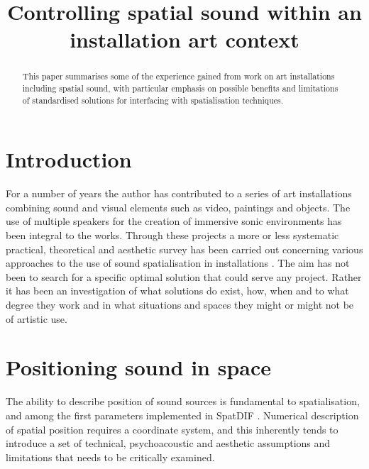 \documentclass{article}
\title{Controlling spatial sound within an installation art context}
\begin{document}
%
\maketitle
%
\begin{abstract}

This paper summarises some of the experience gained from work on art installations including spatial sound, with particular emphasis on possible benefits and limitations of standardised solutions for interfacing with spatialisation techniques.

\end{abstract}
%

\section{Introduction}\label{sec:introduction} %

For a number of years the author has contributed to a series of art installations combining sound and visual elements such as video, paintings and objects. The use of multiple speakers for the creation of immersive sonic environments has been integral to the works. Through these projects a more or less systematic practical, theoretical and aesthetic survey has been carried out concerning various approaches to the use of sound spatialisation in installations \cite{lossius:2007sound_space_body}. The aim has not been to search for a specific optimal solution that could serve any project. Rather it has been an investigation of what solutions do exist, how, when and to what degree they work and in what situations and spaces they might or might not be of artistic use.



\section{Positioning sound in space}\label{sec:coordinate} %


The ability to describe position of sound sources is fundamental to spatialisation, and among the first parameters implemented in SpatDIF \cite{Peters:2008spatdif}. Numerical description of spatial position requires a coordinate system, and this inherently tends to introduce a set of technical, psychoacoustic and aesthetic assumptions and limitations that needs to be critically examined.
\end{document}
